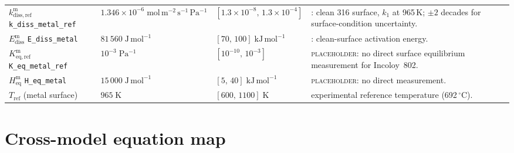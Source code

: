 \documentclass[11pt,a4paper]{article}
\newcommand{\code}[1]{\texttt{#1}}
\begin{document}
{\begin{longtable}{@{}l l l >{\raggedright\arraybackslash}p{4.1cm}@{}}
$k_{\mathrm{diss,ref}}^{\mathrm{m}}$ \code{k\_diss\_metal\_ref} & $1.346\times10^{-6}\;\mathrm{mol\,m^{-2}\,s^{-1}\,Pa^{-1}}$ & $[1.3\times10^{-8},\,1.3\times10^{-4}]$ & \citet{grant1988}: clean 316 surface, $k_1$ at 965\,K; $\pm2$ decades for surface-condition uncertainty. \\
$E_{\mathrm{diss}}^{\mathrm{m}}$ \code{E\_diss\_metal} & $81\,560\;\mathrm{J\,mol^{-1}}$ & $[70,\,100]\;\mathrm{kJ\,mol^{-1}}$ & \citet{grant1988}: clean-surface activation energy. \\
$K_{\mathrm{eq,ref}}^{\mathrm{m}}$ \code{K\_eq\_metal\_ref} & $10^{-3}\;\mathrm{Pa^{-1}}$ & $[10^{-10},\,10^{-3}]$ & \textsc{placeholder}: no direct surface equilibrium measurement for Incoloy~802. \\
$H_{\mathrm{eq}}^{\mathrm{m}}$ \code{H\_eq\_metal} & $15\,000\;\mathrm{J\,mol^{-1}}$ & $[5,\,40]\;\mathrm{kJ\,mol^{-1}}$ & \textsc{placeholder}: no direct measurement. \\
$T_{\mathrm{ref}}$ (metal surface) & $965\;\mathrm{K}$ & $[600,\,1100]\;\mathrm{K}$ & \citet{grant1988} experimental reference temperature (692\,$^\circ$C). \\
\end{longtable}
}

\section{Cross-model equation map}
\end{document}
